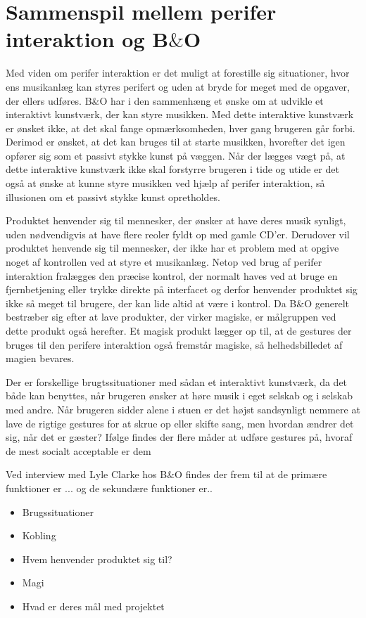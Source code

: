 \section{Sammenspil mellem perifer interaktion og B$\&$O}
\label{Sammenspil mellem perifer interaktion og BO}

Med viden om perifer interaktion er det muligt at forestille sig situationer, hvor ens musikanlæg kan styres perifert og uden at bryde for meget med de opgaver, der ellers udføres. B$\&$O har i den sammenhæng et ønske om at udvikle et interaktivt kunstværk, der kan styre musikken. Med dette interaktive kunstværk er ønsket ikke, at det skal fange opmærksomheden, hver gang brugeren går forbi. Derimod er ønsket, at det kan bruges til at starte musikken, hvorefter det igen opfører sig som et passivt stykke kunst på væggen. Når der lægges vægt på, at dette interaktive kunstværk ikke skal forstyrre brugeren i tide og utide er det også at ønske at kunne styre musikken ved hjælp af perifer interaktion, så illusionen om et passivt stykke kunst opretholdes. 

Produktet henvender sig til mennesker, der ønsker at have deres musik synligt, uden nødvendigvis at have flere reoler fyldt op med gamle CD'er. Derudover vil produktet henvende sig til mennesker, der ikke har et problem med at opgive noget af kontrollen ved at styre et musikanlæg. Netop ved brug af perifer interaktion fralægges den præcise kontrol, der normalt haves ved at bruge en fjernbetjening eller trykke direkte på interfacet og derfor henvender produktet sig ikke så meget til brugere, der kan lide altid at være i kontrol. Da B$\&$O generelt bestræber sig efter at lave produkter, der virker magiske, er målgruppen ved dette produkt også herefter. Et magisk produkt lægger op til, at de gestures der bruges til den perifere interaktion også fremstår magiske, så helhedsbilledet af magien bevares. 

Der er forskellige brugtssituationer med sådan et interaktivt kunstværk, da det både kan benyttes, når brugeren ønsker at høre musik i eget selskab og i selskab med andre. Når brugeren sidder alene i stuen er det højst sandsynligt nemmere at lave de rigtige gestures for at skrue op eller skifte sang, men hvordan ændrer det sig, når det er gæster? Ifølge \textcite[s. 276]{PDF:WouldYouDoThat} findes der flere måder at udføre gestures på, hvoraf de mest socialt acceptable er dem 

Ved interview med Lyle Clarke hos B$\&$O findes der frem til at de primære funktioner er ... og de sekundære funktioner er..


\begin{itemize}
  \item Brugssituationer 
  \item Kobling
  \item Hvem henvender produktet sig til?
  \item Magi
  \item Hvad er deres mål med projektet
\end{itemize}


